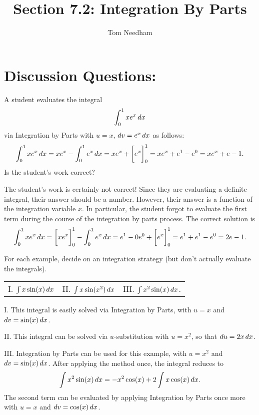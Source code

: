 \documentclass[]{ximera}
\title{Section 7.2: Integration By Parts}
\begin{document}
\begin{abstract}		\end{abstract}
\author{Tom Needham}

\maketitle




\section{Discussion Questions:}


\begin{problem}
A student evaluates the integral 
$$
\int_0^1 x e^x \mathop{}\!d x
$$
via Integration by Parts with $u=x$, $\mathop{}\!d v = e^x \mathop{}\!d x$ as follows:
$$
\int_0^1 x e^x \mathop{}\!d x = x e^x - \int_0^1 e^x \mathop{}\!d x = x e^x + \bigg[ e^x \bigg]_0^1 = x e^x + e^1 - e^0 = xe^x + e -1.
$$
Is the student's work correct?
\end{problem}

\begin{freeResponse}
The student's work is certainly not correct! Since they are evaluating a definite integral, their answer should be a number. However, their answer is a function of the integration variable $x$. In particular, the student forgot to evaluate the first term during the course of the integration by parts process. The correct solution is 
$$
\int_0^1 x e^x \mathop{}\!d x = \bigg[ x e^x \bigg]_0^1 - \int_0^1 e^x \mathop{}\!d x = e^1 - 0e^0 + \bigg[ e^x \bigg]_0^1 = e^1 + e^1 - e^0 = 2e -1.
$$
\end{freeResponse}

\begin{problem}
For each example, decide on an integration strategy (but don't actually evaluate the integrals).

\begin{center}
\begin{tabular}{lll}
I. $\int x \sin (x) \mathop{}\!d x$ \hspace{0.2in} & II. $\int x \sin (x^2) \mathop{}\!d x$  \hspace{0.2in} & III. $\int x^2 \sin (x) \mathop{}\!d x$.
\end{tabular}
\end{center}
\end{problem}

\begin{freeResponse}
I. This integral is easily solved via Integration by Parts, with $u=x$ and $\mathop{}\!d v = \sin(x) \mathop{}\!d x$.

II. This integral can be solved via $u$-substitution with $u = x^2$, so that $\mathop{}\!d u = 2 x \mathop{}\!d x$.

III. Integration by Parts can be used for this example, with $u=x^2$ and $\mathop{}\!d v = \sin(x) \mathop{}\!d x$. After applying the method once, the integral reduces to 
$$
\int x^2 \sin (x) \mathop{}\!d x = -x^2\cos(x) + 2\int x \cos(x) \mathop{}\!d x.
$$
The second term can be evaluated by applying Integration by Parts once more with $u = x$ and $\mathop{}\!d v = \cos (x) \mathop{}\!d x$. 
\end{freeResponse}
\end{document}
